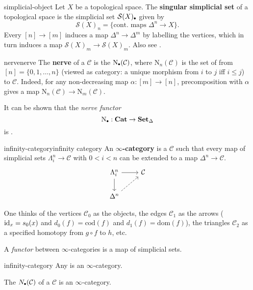 \begin{example}{simplicial-object}
    Let $X$ be a topological space. The \textbf{singular simplicial set} of a topological space is the simplicial set $\mathcal{S}(X)_\bdot$ given by
    \[ \mathcal{S}(X)_n = \{ \text{cont. maps } \Delta^n \to X \} . \]
    Every $[n] \to [m]$ induces a map $\Delta^n \to \Delta^m$ by labelling the vertices, which in turn induces a map $\mathcal{S}(X)_m \to \mathcal{S}(X)_m$. Also see .
\end{example}

\begin{topic}{nerve}{nerve}
    The \textbf{nerve} of a  $\mathcal{C}$ is the  $\text{N}_\bdot(\mathcal{C})$, where $\text{N}_n(\mathcal{C})$ is the set of  from $[n] = \{ 0, 1, \ldots, n \}$ (viewed as category: a unique morphism from $i$ to $j$ iff $i \le j$) to $\mathcal{C}$.
    Indeed, for any non-decreasing map $\alpha : [m] \to [n]$, precomposition with $\alpha$ gives a map $\text{N}_n(\mathcal{C}) \to \text{N}_m(\mathcal{C})$.
    
    It can be shown that the \textit{nerve functor}
    \[ \text{N}_\bdot : \textbf{Cat} \to \textbf{Set}_\Delta \]
    is  .
\end{topic}

\begin{topic}{infinity-category}{infinity category}
    An \textbf{$\infty$-category} is a  $\mathcal{C}$ such that every map of simplicial sets $\Lambda^n_i \to \mathcal{C}$ with $0 < i < n$ can be extended to a map $\Delta^n \to \mathcal{C}$.
    \[ \begin{tikzcd} \Lambda^n_i \arrow{r} \arrow{d} & \mathcal{C} \\ \Delta^n \arrow[dashed]{ur} & \end{tikzcd} \]
    
    One thinks of the vertices $\mathcal{C}_0$ as the objects, the edges $\mathcal{C}_1$ as the arrows ($\text{id}_x = s_0(x)$ and $d_0(f) = \text{cod}(f)$ and $d_1(f) = \text{dom}(f)$), the triangles $\mathcal{C}_2$ as a specified homotopy from $g \circ f$ to $h$, etc.
    
    A \textit{functor} between $\infty$-categories is a map of simplicial sets.
\end{topic}

\begin{example}{infinity-category}
    Any  is an $\infty$-category.
    
    The  $N_\bdot(\mathcal{C})$ of a  $\mathcal{C}$ is an $\infty$-category.
\end{example}
